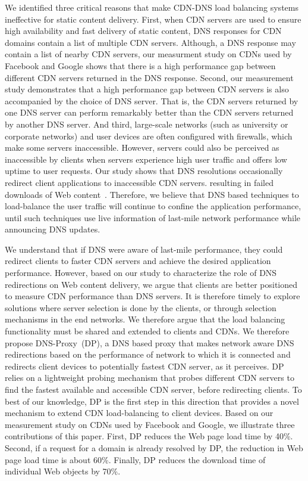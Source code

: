 \documentclass{llncs}
\begin{document}
We identified three critical reasons that make CDN-DNS load balancing systems ineffective for static content delivery.
First, when CDN servers are used to ensure high availability and fast delivery of static content, DNS responses for CDN domains contain a list of multiple CDN servers. 
Although, a DNS response may contain a list of nearby CDN servers, our measurment study on CDNs used by Facebook and Google shows that there is a high performance gap between different CDN servers returned in the DNS response.
Second, our measurement study demonstrates that a high performance gap between CDN servers is also accompanied by the choice of DNS server.
That is, the CDN servers returned by one DNS server can perform remarkably better than the CDN servers returned by another DNS server.
And third, large-scale networks (such as university or corporate networks) and user devices are often configured with firewalls, which make some servers inaccessible.
However, servers could also be perceived as inaccessible by clients when servers experience high user traffic and offers low uptime to user requests.
Our study shows that DNS resolutions occasionally redirect client applications to inaccessible CDN servers. resulting in failed downloads of Web content~\cite{facebook:failedimage}\cite{facebook:failedimage1}\cite{facebookfailedimage:techspot}\cite{facebookfailedimage:techsupportforum}.
Therefore, we believe that DNS based techniques to load-balance the user traffic will continue to confine the application performance, until such techniques use live information of last-mile network performance while announcing DNS updates.


We understand that if DNS were aware of last-mile performance, they could redirect clients to faster CDN servers and achieve the desired application performance.
However, based on our study to characterize the role of DNS redirections on Web content delivery, we argue that clients are better positioned to measure CDN performance than DNS servers.
It is therefore timely to explore solutions where server selection is done by the clients, or through selection mechanisms in the end networks.
We therefore argue that the load balancing functionality must be shared and extended to clients and CDNs. 
We therefore propose DNS-Proxy~(DP), a DNS based proxy that makes network aware DNS redirections based on the performance of network to which it is connected and redirects client devices to potentially fastest CDN server, as it perceives. 
DP relies on a lightweight probing mechanism that probes different CDN servers to find the fastest available and accessible CDN server, before redirecting clients.
To best of our knowledge, DP is the first step in this direction that provides a novel mechanism to extend CDN load-balancing to client devices.
Based on our measurement study on CDNs used by Facebook and Google, we illustrate three contributions of this paper.
First, DP reduces the Web page load time by 40\%.
Second, if a request for a domain is already resolved by DP, the reduction in Web page load time is about 60\%.
Finally, DP reduces the download time of individual Web objects by 70\%.
\end{document}
